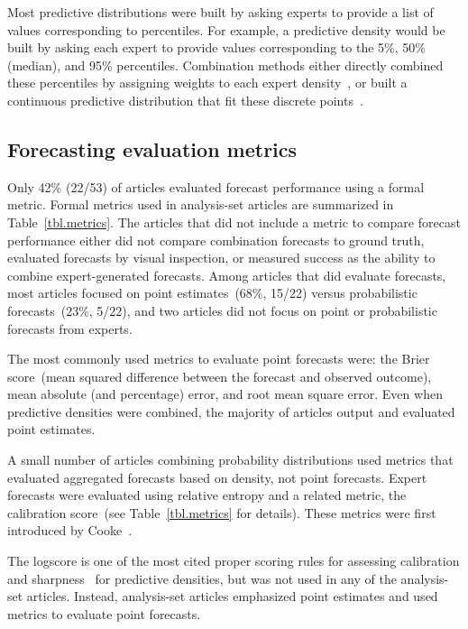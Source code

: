 \documentclass[preprint,authoryear]{elsarticle}
\begin{document}
Most predictive distributions were built by asking experts to provide a list of values corresponding to percentiles.
For example, a predictive density would be built by asking each expert to provide values corresponding to the 5\%, 50\% (median), and 95\% percentiles.
Combination methods either directly combined these percentiles by assigning weights to each expert density~\citep{ISI:000327676900001,hanea2018value,morales2017characterization,cai2016simple,ISI:000391078100005,kabak2008aggregating,zio1997accounting,BRITO201655}, or built a continuous predictive distribution that fit these discrete points~\cite{brito2012behavioral,abramson1996hailfinder,neves2008life,failing2004using,wang2008probabilistic,kurowicka2010probabilistic}.

\subsection{Forecasting evaluation metrics}
Only 42\% (22/53) of articles evaluated forecast performance using a formal metric.
Formal metrics used in analysis-set articles are summarized in Table~\ref{tbl.metrics}.
The articles that did not include a metric to compare forecast performance either did not compare combination forecasts to ground truth, evaluated forecasts by visual inspection, or measured success as the ability to combine expert-generated forecasts.
Among articles that did evaluate forecasts, most articles focused on point estimates~(68\%, 15/22) versus probabilistic forecasts~(23\%, 5/22), and two articles did not focus on point or probabilistic forecasts from experts.

The most commonly used metrics to evaluate point forecasts were: the Brier score~(mean squared difference between the forecast and observed outcome), mean absolute (and percentage) error, and root mean square error.
Even when predictive densities were combined, the majority of articles output and evaluated point estimates.

A small number of articles combining probability distributions used metrics that evaluated aggregated forecasts based on density, not point forecasts.
Expert forecasts were evaluated using relative entropy and a related metric, the calibration score~(see Table~\ref{tbl.metrics} for details).
These metrics were first introduced by Cooke~\citep{cooke1988calibration,cooke1991experts}.

The logscore is one of the most cited proper scoring rules for assessing calibration and sharpness~\citep{gneiting2007strictly,gneiting2011comparing,hora2015calibration} for predictive densities, but was not used in any of the analysis-set articles.
Instead, analysis-set articles emphasized point estimates and used metrics to evaluate point forecasts.
\end{document}
